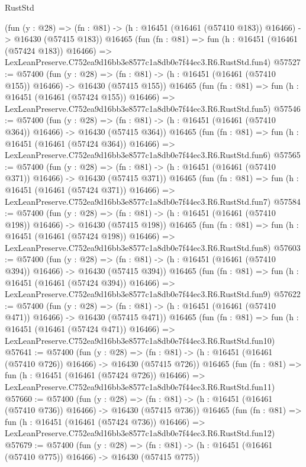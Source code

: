 \begin{lexlean}{RustStd}
\begin{coremodule}
    (fun (y : @28) =>
    (fn : @81) -> (h : @16451 (@16461 (@57410 @183)) @16466) -> @16430 (@57415 @183))
    @16465
    (fun (fn : @81) =>
    fun (h : @16451 (@16461 (@57424 @183)) @16466) =>
    LexLeanPreserve.C752ea9d16bb3e8577c1a8db0e7f44ec3.R6.RustStd.fun4)
@57527 := @57400
    (fun (y : @28) =>
    (fn : @81) -> (h : @16451 (@16461 (@57410 @155)) @16466) -> @16430 (@57415 @155))
    @16465
    (fun (fn : @81) =>
    fun (h : @16451 (@16461 (@57424 @155)) @16466) =>
    LexLeanPreserve.C752ea9d16bb3e8577c1a8db0e7f44ec3.R6.RustStd.fun5)
@57546 := @57400
    (fun (y : @28) =>
    (fn : @81) -> (h : @16451 (@16461 (@57410 @364)) @16466) -> @16430 (@57415 @364))
    @16465
    (fun (fn : @81) =>
    fun (h : @16451 (@16461 (@57424 @364)) @16466) =>
    LexLeanPreserve.C752ea9d16bb3e8577c1a8db0e7f44ec3.R6.RustStd.fun6)
@57565 := @57400
    (fun (y : @28) =>
    (fn : @81) -> (h : @16451 (@16461 (@57410 @371)) @16466) -> @16430 (@57415 @371))
    @16465
    (fun (fn : @81) =>
    fun (h : @16451 (@16461 (@57424 @371)) @16466) =>
    LexLeanPreserve.C752ea9d16bb3e8577c1a8db0e7f44ec3.R6.RustStd.fun7)
@57584 := @57400
    (fun (y : @28) =>
    (fn : @81) -> (h : @16451 (@16461 (@57410 @198)) @16466) -> @16430 (@57415 @198))
    @16465
    (fun (fn : @81) =>
    fun (h : @16451 (@16461 (@57424 @198)) @16466) =>
    LexLeanPreserve.C752ea9d16bb3e8577c1a8db0e7f44ec3.R6.RustStd.fun8)
@57603 := @57400
    (fun (y : @28) =>
    (fn : @81) -> (h : @16451 (@16461 (@57410 @394)) @16466) -> @16430 (@57415 @394))
    @16465
    (fun (fn : @81) =>
    fun (h : @16451 (@16461 (@57424 @394)) @16466) =>
    LexLeanPreserve.C752ea9d16bb3e8577c1a8db0e7f44ec3.R6.RustStd.fun9)
@57622 := @57400
    (fun (y : @28) =>
    (fn : @81) -> (h : @16451 (@16461 (@57410 @471)) @16466) -> @16430 (@57415 @471))
    @16465
    (fun (fn : @81) =>
    fun (h : @16451 (@16461 (@57424 @471)) @16466) =>
    LexLeanPreserve.C752ea9d16bb3e8577c1a8db0e7f44ec3.R6.RustStd.fun10)
@57641 := @57400
    (fun (y : @28) =>
    (fn : @81) -> (h : @16451 (@16461 (@57410 @726)) @16466) -> @16430 (@57415 @726))
    @16465
    (fun (fn : @81) =>
    fun (h : @16451 (@16461 (@57424 @726)) @16466) =>
    LexLeanPreserve.C752ea9d16bb3e8577c1a8db0e7f44ec3.R6.RustStd.fun11)
@57660 := @57400
    (fun (y : @28) =>
    (fn : @81) -> (h : @16451 (@16461 (@57410 @736)) @16466) -> @16430 (@57415 @736))
    @16465
    (fun (fn : @81) =>
    fun (h : @16451 (@16461 (@57424 @736)) @16466) =>
    LexLeanPreserve.C752ea9d16bb3e8577c1a8db0e7f44ec3.R6.RustStd.fun12)
@57679 := @57400
    (fun (y : @28) =>
    (fn : @81) -> (h : @16451 (@16461 (@57410 @775)) @16466) -> @16430 (@57415 @775))

\end{coremodule}
\end{lexlean}
